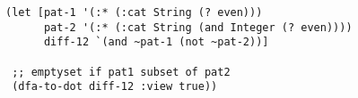 \begin{lstlisting}[style=reclojureClojure]
(let [pat-1 '(:* (:cat String (? even)))
      pat-2 '(:* (:cat String (and Integer (? even))))
      diff-12 `(and ~pat-1 (not ~pat-2))]

 ;; emptyset if pat1 subset of pat2
 (dfa-to-dot diff-12 :view true))
\end{lstlisting}
